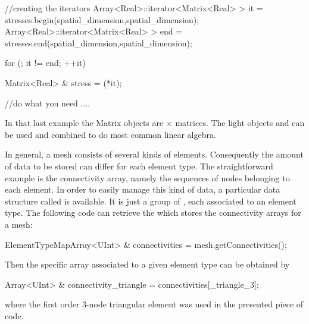 \begin{cpp}
  //creating the iterators
  Array<Real>::iterator<Matrix<Real> > it  = stresses.begin(spatial_dimension,spatial_dimension);
  Array<Real>::iterator<Matrix<Real> > end = stresses.end(spatial_dimension,spatial_dimension);

  for (; it != end; ++it){
    Matrix<Real> & stress = (*it);

    //do what you need
    ....

  }
\end{cpp}
In that last example the Matrix objects are
 $\times$  matrices.
The light objects  and  can be used and combined
to do most common linear algebra.

In general, a mesh consists of several kinds of elements. Consequently the
amount of data to be stored can differ for each element type. The straightforward
example is the connectivity array, namely the sequences of nodes belonging to
each element. In order to easily manage this kind of data, a
particular data structure called  is available.
It is just a group of , each associated to an element
type. The following code can retrieve the 
which stores the connectivity arrays for a mesh:
\begin{cpp}
  ElementTypeMapArray<UInt> & connectivities = mesh.getConnectivities();
\end{cpp}
Then the specific array associated to a given element type can be
obtained by
\begin{cpp}
  Array<UInt> & connectivity_triangle = connectivities[_triangle_3];
\end{cpp}
where the first order 3-node triangular element was used in the presented
piece of code.

